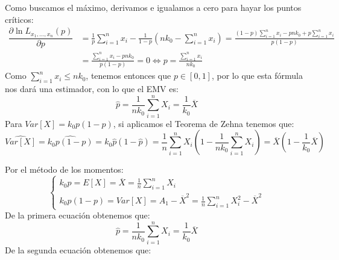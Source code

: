 \begin{ejercicio}
\begin{description}
            Como buscamos el máximo, derivamos e igualamos a cero para hayar los puntos críticos:
            \begin{align*}
                \dfrac{\partial \ln L_{x_1,\ldots,x_n}(p)}{\partial p} &= \frac{1}{p}\sum_{i=1}^{n}x_i - \frac{1}{1-p}\left(nk_0 - \sum_{i=1}^{n}x_i\right) = \frac{(1-p)\sum\limits_{i=1}^{n}x_i - pnk_0 + p\sum\limits_{i=1}^{n}x_i}{p(1-p)} \\
                                                                       &= \frac{\sum\limits_{i=1}^{n}x_i -pnk_0}{p(1-p)} = 0 \Longleftrightarrow p = \frac{\sum\limits_{i=1}^{n}x_i}{nk_0}
            \end{align*}
            Como $\sum\limits_{i=1}^{n}x_i\leq nk_0$, tenemos entonces que $p\in [0,1]$, por lo que esta fórmula nos dará una estimador, con lo que el EMV es:
            \begin{equation*}
                \widehat{p} = \frac{1}{nk_0}\sum_{i=1}^{n}X_i = \frac{1}{k_0}\overline{X}
            \end{equation*}
            Para $Var[X] = k_0p(1-p)$, si aplicamos el Teorema de Zehna tenemos que:
            \begin{equation*}
                \widehat{Var[X]} = \widehat{k_0p(1-p)} = k_0\widehat{p}(1-\widehat{p}) = \frac{1}{n}\sum_{i=1}^{n}X_i\left(1-\frac{1}{nk_0}\sum_{i=1}^{n}X_i\right) = \overline{X}\left(1-\frac{1}{k_0}\overline{X}\right)
            \end{equation*}
        \item [Por el método de los momentos.] 
            Por el método de los momentos:
            \begin{equation*}
                \left\{\begin{array}{l}
                        k_0p = E[X] = \overline{X} = \frac{1}{n}\sum\limits_{i=1}^{n}X_i \\
                        k_0p(1-p) = Var[X] = A_1 - \overline{X}^2 = \frac{1}{n}\sum\limits_{i=1}^{n}X_i^2 - \overline{X}^2
                \end{array}\right.
            \end{equation*}
            De la primera ecuación obtenemos que:
            \begin{equation*}
                \widehat{p} = \frac{1}{nk_0}\sum_{i=1}^{n}X_i = \frac{1}{k_0}\overline{X}
            \end{equation*}
            De la segunda ecuación obtenemos que:
            \begin{equation*}

\end{equation*}
\end{description}
\end{ejercicio}
